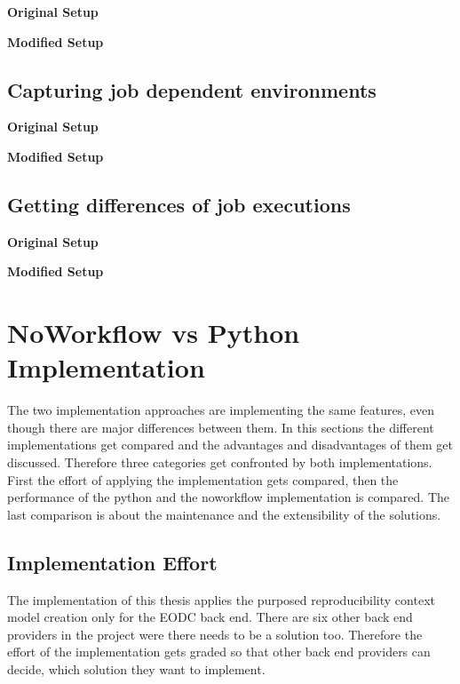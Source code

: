 \documentclass[draft,final]{vutinfth} %
\begin{document}
\textbf{Original Setup}

\textbf{Modified Setup}



\subsection{Capturing job dependent environments}\label{Evaluation:Use Case2}

\textbf{Original Setup}

\textbf{Modified Setup}

\subsection{Getting differences of job executions}\label{Evaluation:Use Case3}

\textbf{Original Setup}

\textbf{Modified Setup}


\section{NoWorkflow vs Python Implementation}\label{Evaluation:NvsP}
The two implementation approaches are implementing the same features, even though there are major differences between them. In this sections the different implementations get compared and the advantages and disadvantages of them get discussed. Therefore three categories get confronted by both implementations. First the effort of applying the implementation gets compared, then the performance of the python and the noworkflow implementation is compared. The last comparison is about the maintenance and the extensibility of the solutions. 

\subsection{Implementation Effort}\label{NvsP:Implementation Effort}
The implementation of this thesis applies the purposed reproducibility context model creation only for the EODC back end. There are six other back end providers in the project were there needs to be a solution too. Therefore the effort of the implementation gets graded so that other back end providers can decide, which solution they want to implement.
\end{document}
